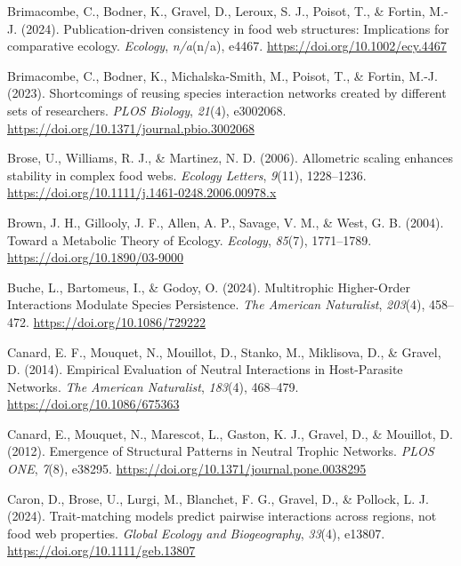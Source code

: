 \documentclass[
]{article}
\newlength{\cslhangindent}
\newenvironment{CSLReferences}[2] %
 {\begin{list}{}{%
  \setlength{\itemindent}{0pt}
  \setlength{\leftmargin}{0pt}
  \setlength{\parsep}{0pt}
  \ifodd #1
   \setlength{\leftmargin}{\cslhangindent}
   \setlength{\itemindent}{-1\cslhangindent}
  \fi
  \setlength{\itemsep}{#2\baselineskip}}}
 {\end{list}}
\begin{document}
\begin{CSLReferences}{1}{0}
Brimacombe, C., Bodner, K., Gravel, D., Leroux, S. J., Poisot, T., \&
Fortin, M.-J. (2024). Publication-driven consistency in food web
structures: {Implications} for comparative ecology. \emph{Ecology},
\emph{n/a}(n/a), e4467. \url{https://doi.org/10.1002/ecy.4467}

Brimacombe, C., Bodner, K., Michalska-Smith, M., Poisot, T., \& Fortin,
M.-J. (2023). Shortcomings of reusing species interaction networks
created by different sets of researchers. \emph{PLOS Biology},
\emph{21}(4), e3002068.
\url{https://doi.org/10.1371/journal.pbio.3002068}

Brose, U., Williams, R. J., \& Martinez, N. D. (2006). Allometric
scaling enhances stability in complex food webs. \emph{Ecology Letters},
\emph{9}(11), 1228--1236.
\url{https://doi.org/10.1111/j.1461-0248.2006.00978.x}

Brown, J. H., Gillooly, J. F., Allen, A. P., Savage, V. M., \& West, G.
B. (2004). Toward a {Metabolic Theory} of {Ecology}. \emph{Ecology},
\emph{85}(7), 1771--1789. \url{https://doi.org/10.1890/03-9000}

Buche, L., Bartomeus, I., \& Godoy, O. (2024). Multitrophic
{Higher-Order Interactions Modulate Species Persistence}. \emph{The
American Naturalist}, \emph{203}(4), 458--472.
\url{https://doi.org/10.1086/729222}

Canard, E. F., Mouquet, N., Mouillot, D., Stanko, M., Miklisova, D., \&
Gravel, D. (2014). Empirical {Evaluation} of {Neutral Interactions} in
{Host-Parasite Networks}. \emph{The American Naturalist}, \emph{183}(4),
468--479. \url{https://doi.org/10.1086/675363}

Canard, E., Mouquet, N., Marescot, L., Gaston, K. J., Gravel, D., \&
Mouillot, D. (2012). Emergence of {Structural Patterns} in {Neutral
Trophic Networks}. \emph{PLOS ONE}, \emph{7}(8), e38295.
\url{https://doi.org/10.1371/journal.pone.0038295}

Caron, D., Brose, U., Lurgi, M., Blanchet, F. G., Gravel, D., \&
Pollock, L. J. (2024). Trait-matching models predict pairwise
interactions across regions, not food web properties. \emph{Global
Ecology and Biogeography}, \emph{33}(4), e13807.
\url{https://doi.org/10.1111/geb.13807}


\end{CSLReferences}
\end{document}

